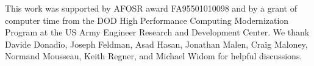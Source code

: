 \documentclass[aps,prb,onecolumn,preprint,superscriptaddress,footinbib,amsmath,amssymb,floatfix]{revtex4}
\begin{document}
\begin{acknowledgments}
This work was supported by AFOSR award FA95501010098 and by a grant 
of computer time from the DOD 
High Performance Computing Modernization Program at the US Army 
Engineer 
Research and Development Center. 
We thank Davide Donadio, Joseph Feldman, Asad Hasan, Jonathan Malen,  
Craig Maloney, Normand Mousseau, Keith Regner, and Michael Widom 
for helpful discussions.
\end{acknowledgments}



\end{document}

